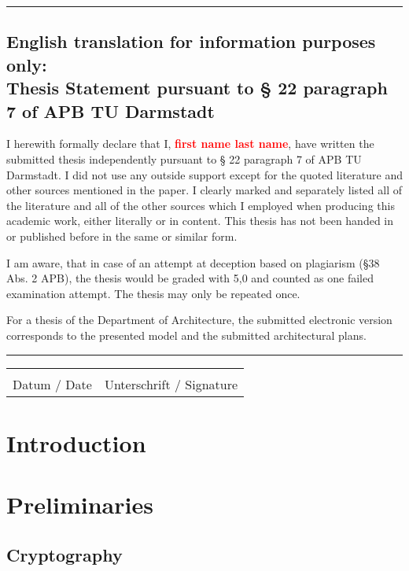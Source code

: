 \documentclass{cacthesis}
\begin{document}
	\vspace{10pt}
	\hrule
	
	\section*{English translation for information purposes only:\\Thesis Statement pursuant to § 22 paragraph 7 of APB TU Darmstadt}
	
	I herewith formally declare that I, \textcolor{red}{\textbf{first name last name}}, have written the submitted thesis independently pursuant to § 22 paragraph 7 of APB TU Darmstadt. I did not use any outside support except for the quoted literature and other sources mentioned in the paper. I clearly marked and separately listed all of the literature and all of the other sources which I employed when producing this academic work, either literally or in content. This thesis has not been handed in or published before in the same or similar form.
	
	I am aware, that in case of an attempt at deception based on plagiarism (§38 Abs. 2 APB), the thesis would be graded with 5,0 and counted as one failed examination attempt. The thesis may only be repeated once.
	
	For a thesis of the Department of Architecture, the submitted electronic version corresponds to the presented model and the submitted architectural plans.
	
	\vspace{10pt}
	\hrule
	\vspace{70pt}
	
	\noindent\begin{tabular}{l@{\hskip 1in}l}
		\makebox[1.8in]{\hrulefill} & \makebox[3.5in]{\hrulefill}\\
		Datum / Date & Unterschrift / Signature
	\end{tabular}
	
	\tableofcontents
	
	\mainmatter
	
	\chapter{Introduction}

\chapter{Preliminaries}
\section{Cryptography}
\end{document}

